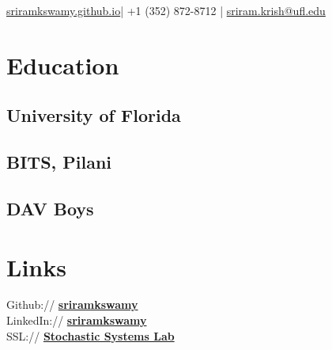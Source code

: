 \documentclass[]{resume}
\begin{document}
%
%

%
%
{\href{http://sriramkswamy.github.io}{sriramkswamy.github.io}|
	+1 (352) 872-8712	| \href{mailto:sriram.krish@ufl.edu}{sriram.krish@ufl.edu}
}

%
%

\begin{minipage}[t]{0.33\textwidth}


\section{Education}

\subsection{University of Florida}
\sectionsep

\subsection{BITS, Pilani}
\sectionsep

\subsection{DAV Boys}


\section{Links}
Github:// \href{https://github.com/sriramkswamy}{\bf sriramkswamy} \\
LinkedIn://  \href{https://www.linkedin.com/in/sriramkswamy}{\bf sriramkswamy} \\
SSL://  \href{http://web.mae.ufl.edu/~mrinalkumar/Research/research.html}{\bf Stochastic Systems Lab} \\


\end{minipage}
\end{document}
